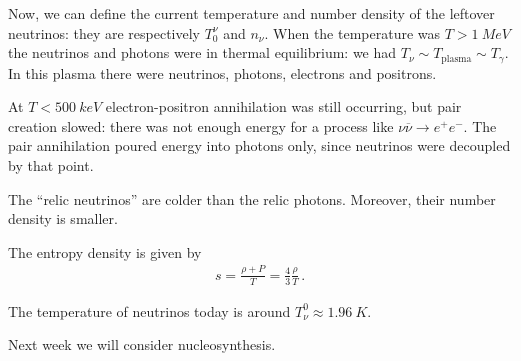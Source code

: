 \documentclass[main.tex]{subfiles}
\begin{document}
Now, we can define the current temperature and number density of the leftover neutrinos: they are respectively \(T^{\nu }_{0}\) and \(n_\nu \).
When the temperature was \(T > \SI{1}{MeV}\) the neutrinos and photons were in thermal equilibrium: we had \(T_\nu \sim T _{\text{plasma}} \sim T_\gamma \). In this plasma there were neutrinos, photons, electrons and positrons.

At \(T < \SI{500}{keV}\) electron-positron annihilation was still occurring, but pair creation slowed: there was not enough energy for a process like \(\nu \overline{\nu} \to e^{+}e^{-}\).
The pair annihilation poured energy into photons only, since neutrinos were decoupled by that point. 

The ``relic neutrinos'' are colder than the relic photons. Moreover, their number density is smaller. 


The entropy density is given by 
%
\begin{align}
s = \frac{\rho + P}{T} = \frac{4}{3} \frac{\rho}{T}
\,.
\end{align}

The temperature of neutrinos today is around \(T^{0}_{\nu } \approx \SI{1.96}{K}\). 

Next week we will consider nucleosynthesis. 
\end{document}
